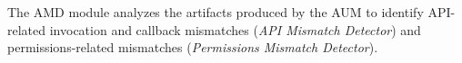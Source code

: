 The AMD module analyzes the artifacts
produced by the AUM to identify
API-related invocation and callback mismatches ({\it API Mismatch Detector}) and permissions-related
mismatches ({\it Permissions Mismatch
Detector}).
 


\begin{figure}[t]
        
\end{figure}




